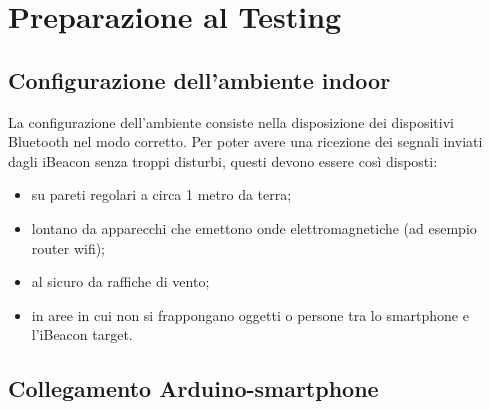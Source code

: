 \chapter{Preparazione al Testing}\label{ch:preparazione_testing}

\section{Configurazione dell'ambiente indoor}
La configurazione dell'ambiente consiste nella disposizione dei dispositivi Bluetooth nel modo corretto.
Per poter avere una ricezione dei segnali inviati dagli iBeacon senza troppi disturbi, questi devono essere così disposti:
\begin{itemize}
	\item su pareti regolari a circa 1 metro da terra;
	
	\item lontano da apparecchi che emettono onde elettromagnetiche (ad esempio router wifi);
	
	\item al sicuro da raffiche di vento;
	
	\item in aree in cui non si frappongano oggetti o persone tra lo smartphone e l'iBeacon target.
\end{itemize}

\newpage
\section{Collegamento Arduino-smartphone}

